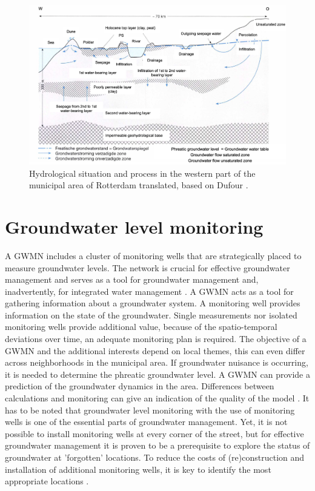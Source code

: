 \begin{figure}[h]
    \centering
    \includegraphics[width=0.95\linewidth]{figures/figures theory/dufour vertaling.png}
    \caption{Hydrological situation and process in the western part of the municipal area of Rotterdam translated, based on Dufour \cite{dufour-1998}.}
    \label{dufour}
\end{figure}
\newpage
\section{Groundwater level monitoring}
A GWMN includes a cluster of monitoring wells that are strategically placed to measure groundwater levels. The network is crucial for effective groundwater management and serves as a tool for groundwater management and, inadvertently, for integrated water management \cite{vries-1992}. A GWMN acts as a tool for gathering information about a groundwater system. A monitoring well provides information on the state of the groundwater. Single measurements nor isolated monitoring wells provide additional value, because of the spatio-temporal deviations over time, an adequate monitoring plan is required. The objective of a GWMN and the additional interests depend on local themes, this can even differ across neighborhoods in the municipal area. If groundwater nuisance is occurring, it is needed to determine the phreatic groundwater level. A GWMN can provide a prediction of the groundwater dynamics in the area. Differences between calculations and monitoring can give an indication of the quality of the model \cite{zelfde-2011}. It has to be noted that groundwater level monitoring with the use of monitoring wells is one of the essential parts of groundwater management. Yet, it is not possible to install monitoring wells at every corner of the street, but for effective groundwater management it is proven to be a prerequisite to explore the status of groundwater at 'forgotten' locations. To reduce the costs of (re)construction and installation of additional monitoring wells, it is key to identify the most appropriate locations \cite{massop-2003}. 

